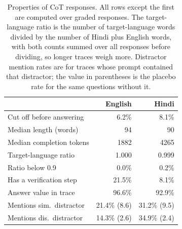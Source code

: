 \begin{table}[t]
\centering
\small
\setlength{\tabcolsep}{4pt}
\begin{tabular}{lrr}
\toprule
 & English & Hindi \\
\midrule
Cut off before answering & 6.2\% & 8.1\% \\
Median length (words) & 94 & 90 \\
Median completion tokens & 1882 & 4265 \\
Target-language ratio & 1.000 & 0.999 \\
Ratio below 0.9 & 0.0\% & 0.2\% \\
Has a verification step & 21.5\% & 8.1\% \\
Answer value in trace & 96.6\% & 92.9\% \\
Mentions sim.\ distractor & 21.4\% (8.6) & 31.2\% (9.5) \\
Mentions dis.\ distractor & 14.3\% (2.6) & 34.9\% (2.4) \\
\bottomrule
\end{tabular}
\caption{Properties of CoT responses. All rows except the first are computed over graded responses. The target-language ratio is the number of target-language words divided by the number of Hindi plus English words, with both counts summed over all responses before dividing, so longer traces weigh more. Distractor mention rates are for traces whose prompt contained that distractor; the value in parentheses is the placebo rate for the same questions without it.}
\label{tab:trace}
\end{table}
